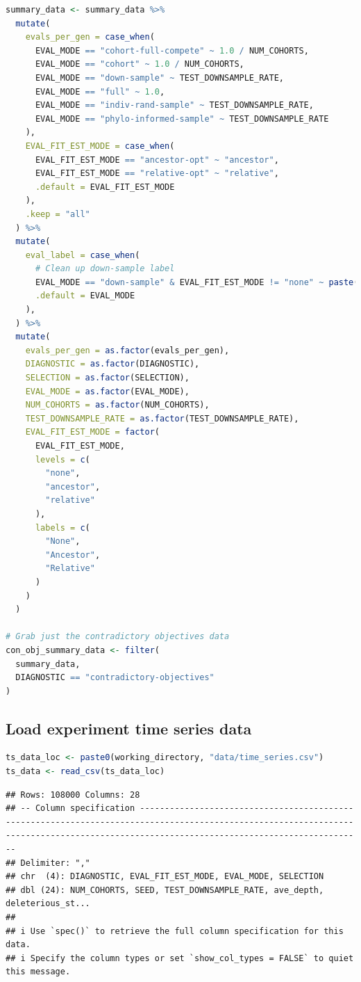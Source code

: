 \documentclass[
]{book}
\begin{document}
\begin{lstlisting}[language=R]
summary_data <- summary_data %>%
  mutate(
    evals_per_gen = case_when(
      EVAL_MODE == "cohort-full-compete" ~ 1.0 / NUM_COHORTS,
      EVAL_MODE == "cohort" ~ 1.0 / NUM_COHORTS,
      EVAL_MODE == "down-sample" ~ TEST_DOWNSAMPLE_RATE,
      EVAL_MODE == "full" ~ 1.0,
      EVAL_MODE == "indiv-rand-sample" ~ TEST_DOWNSAMPLE_RATE,
      EVAL_MODE == "phylo-informed-sample" ~ TEST_DOWNSAMPLE_RATE
    ),
    EVAL_FIT_EST_MODE = case_when(
      EVAL_FIT_EST_MODE == "ancestor-opt" ~ "ancestor",
      EVAL_FIT_EST_MODE == "relative-opt" ~ "relative",
      .default = EVAL_FIT_EST_MODE
    ),
    .keep = "all"
  ) %>%
  mutate(
    eval_label = case_when(
      # Clean up down-sample label
      EVAL_MODE == "down-sample" & EVAL_FIT_EST_MODE != "none" ~ paste("down-sample", EVAL_FIT_EST_MODE, sep="-"),
      .default = EVAL_MODE
    ),
  ) %>%
  mutate(
    evals_per_gen = as.factor(evals_per_gen),
    DIAGNOSTIC = as.factor(DIAGNOSTIC),
    SELECTION = as.factor(SELECTION),
    EVAL_MODE = as.factor(EVAL_MODE),
    NUM_COHORTS = as.factor(NUM_COHORTS),
    TEST_DOWNSAMPLE_RATE = as.factor(TEST_DOWNSAMPLE_RATE),
    EVAL_FIT_EST_MODE = factor(
      EVAL_FIT_EST_MODE,
      levels = c(
        "none",
        "ancestor",
        "relative"
      ),
      labels = c(
        "None",
        "Ancestor",
        "Relative"
      )
    )
  )

# Grab just the contradictory objectives data
con_obj_summary_data <- filter(
  summary_data,
  DIAGNOSTIC == "contradictory-objectives"
)
\end{lstlisting}

\hypertarget{load-experiment-time-series-data-1}{%
\subsection{Load experiment time series data}\label{load-experiment-time-series-data-1}}

\begin{lstlisting}[language=R]
ts_data_loc <- paste0(working_directory, "data/time_series.csv")
ts_data <- read_csv(ts_data_loc)
\end{lstlisting}

\begin{lstlisting}
## Rows: 108000 Columns: 28
## -- Column specification -----------------------------------------------------------------------------------------------------------------------------------------------------------------------------------------
## Delimiter: ","
## chr  (4): DIAGNOSTIC, EVAL_FIT_EST_MODE, EVAL_MODE, SELECTION
## dbl (24): NUM_COHORTS, SEED, TEST_DOWNSAMPLE_RATE, ave_depth, deleterious_st...
## 
## i Use `spec()` to retrieve the full column specification for this data.
## i Specify the column types or set `show_col_types = FALSE` to quiet this message.
\end{lstlisting}
\end{document}
